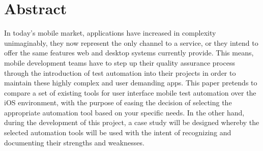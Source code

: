 %
\chapter*{Abstract}
\label{sec:abstract}
\vspace*{-10mm}

In today’s mobile market, applications have increased in complexity unimaginably, they now represent the only channel to a service, or they intend to offer the same features web and desktop systems currently provide. This means, mobile development teams have to step up their quality assurance process through the introduction of test automation into their projects in order to maintain these highly complex and user demanding apps. This paper pretends to compare a set of existing tools for user interface mobile test automation over the iOS environment, with the purpose of easing the decision of selecting the appropriate automation tool based on your specific needs. In the other hand, during the development of this project, a case study will be designed whereby the selected automation tools will be used with the intent of recognizing and documenting their strengths and weaknesses.

\vspace*{20mm}
